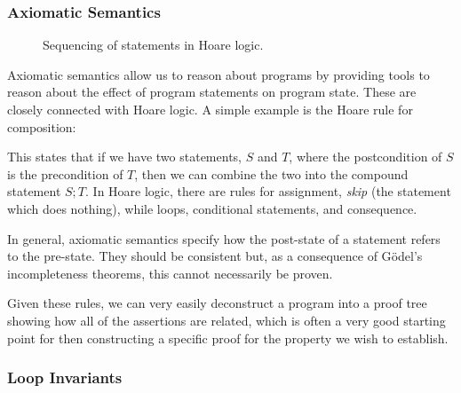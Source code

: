 \subsubsection{Axiomatic Semantics}
\label{sec:lit-verification-embedding-axioms}

\begin{figure}[t]
  \centering
  \begin{prooftree}
  \end{prooftree}
  \caption{Sequencing of statements in Hoare logic.}
  \label{fig:exmpl:lit-embedding-sequencing}
\end{figure}

Axiomatic semantics allow us to reason about programs by providing
tools to reason about the effect of program statements on program
state\cite{Hoare69}. These are closely connected with Hoare logic. A
simple example is the Hoare rule for composition:

\begin{prooftree}
\end{prooftree}

This states that if we have two statements, $S$ and $T$, where the
postcondition of $S$ is the precondition of $T$, then we can combine
the two into the compound statement $S;T$\cite{Hoare69}. In Hoare
logic, there are rules for assignment, \textit{skip} (the statement
which does nothing), while loops, conditional statements, and
consequence.

In general, axiomatic semantics specify how the post-state of a
statement refers to the pre-state. They should be consistent but, as
a consequence of G{\"o}del's incompleteness theorems, this cannot
necessarily be proven.

Given these rules, we can very easily deconstruct a program into a
proof tree showing how all of the assertions are related, which is
often a very good starting point for then constructing a specific
proof for the property we wish to establish.

\subsubsection{Loop Invariants}
\label{sec:lit-verification-embedding-invariants}

